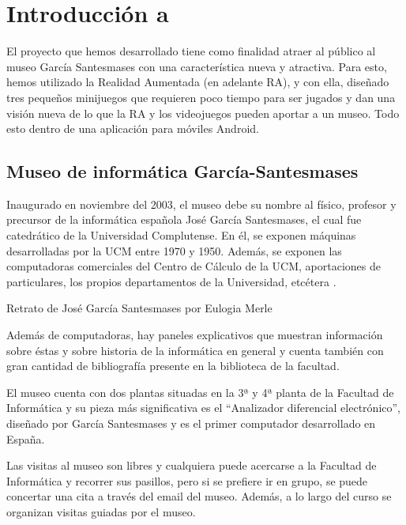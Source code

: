 %
%

\chapter{Introducción a \appname}

El proyecto que hemos desarrollado tiene como finalidad atraer al público al museo García Santesmases con una característica nueva y atractiva. Para esto, hemos utilizado la Realidad Aumentada (en adelante RA), y con ella, diseñado tres pequeños minijuegos que requieren poco tiempo para ser jugados y dan una visión nueva de lo que la RA y los videojuegos pueden aportar a un museo. Todo esto dentro de una aplicación para móviles Android.

\section{Museo de informática García-Santesmases}
\label{cap1:sec:museo}

Inaugurado en noviembre del 2003, el museo debe su nombre al físico, profesor y precursor de la informática española José García Santesmases, el cual fue catedrático de la Universidad Complutense. En él, se exponen máquinas desarrolladas por la UCM entre 1970 y 1950. Además, se exponen las computadoras comerciales del Centro de Cálculo de la UCM, aportaciones de particulares, los propios departamentos de la Universidad, etcétera \cite{migs}.

	{Retrato de José García Santesmases por Eulogia Merle}

Además de computadoras, hay paneles explicativos que muestran información sobre éstas y sobre historia de la informática en general y cuenta también con gran cantidad de bibliografía presente en la biblioteca de la facultad.

El museo cuenta con dos plantas situadas en la 3ª y 4ª planta de la Facultad de Informática y su pieza más significativa es el ``Analizador diferencial electrónico'', diseñado por García Santesmases y es el primer computador desarrollado en España.

Las visitas al museo son libres y cualquiera puede acercarse a la Facultad de Informática y recorrer sus pasillos, pero si se prefiere ir en grupo, se puede concertar una cita a través del email del museo. Además, a lo largo del curso se organizan visitas guiadas por el museo.

